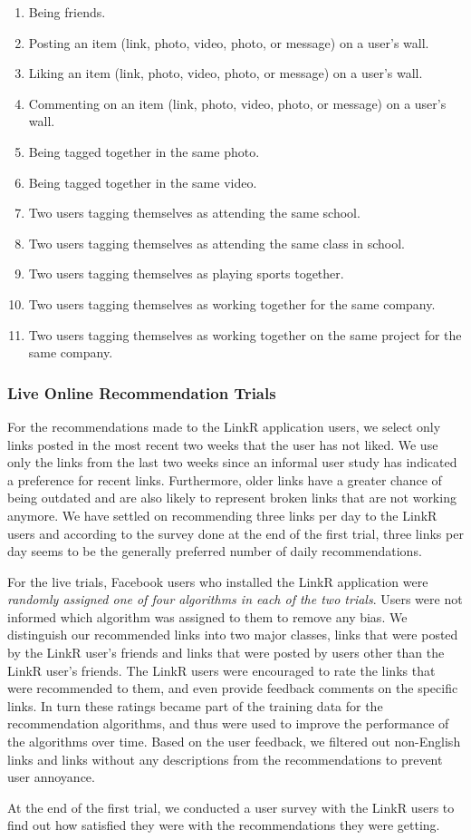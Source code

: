 \begin{enumerate}
\item{Being friends.}
\item{Posting an item (link, photo, video, photo, or message) on a user's wall.}
\item{Liking an item (link, photo, video, photo, or message) on a user's wall.}
\item{Commenting on an item (link, photo, video, photo, or message) on a user's wall.}
\item{Being tagged together in the same photo.}
\item{Being tagged together in the same video.}
\item{Two users tagging themselves as attending the same school.}
\item{Two users tagging themselves as attending the same class in school.}
\item{Two users tagging themselves as playing sports together.}
\item{Two users tagging themselves as working together for the same company.}
\item{Two users tagging themselves as working together on the same project for the same company.}
\end{enumerate}

\subsubsection{Live Online Recommendation Trials}

For the recommendations made to the LinkR application users, we select
only links posted in the most recent two weeks that the user has not
liked. We use only the links from the last two weeks since an informal
user study has indicated a preference for recent links.  Furthermore,
older links have a greater chance of being outdated and are also
likely to represent broken links that are not working anymore. We have
settled on recommending three links per day to the LinkR users and
according to the survey done at the end of the first trial, three
links per day seems to be the generally preferred number of
daily recommendations.

For the live trials, Facebook users who installed the LinkR
application were \emph{randomly assigned one of four algorithms in
each of the two trials}. Users were not informed which algorithm was
assigned to them to remove any bias. We distinguish our recommended
links into two major classes, links that were posted by the LinkR
user's friends and links that were posted by users other than the
LinkR user's friends. The LinkR users were encouraged to rate the
links that were recommended to them, and even provide feedback
comments on the specific links. In turn these ratings became part of
the training data for the recommendation algorithms, and thus were used
to improve the performance of the algorithms over time. Based on the
user feedback, we filtered out non-English links and links without any
descriptions from the recommendations to prevent user annoyance.

At the end of the first trial, we conducted a user survey with the
LinkR users to find out how satisfied they were with the
recommendations they were getting.
 